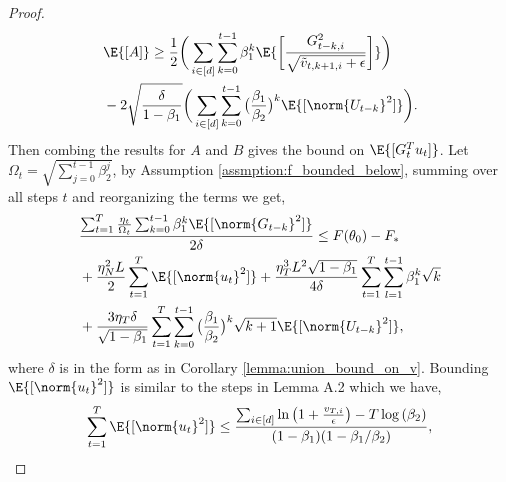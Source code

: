 \documentclass[letterpaper]{article} %
\begin{document}
\begin{proof}
    \begin{align*}
        &\E{[A]} \geq \frac{1}{2} \bigg( \sum_{i\in[d]} \sum_{k=0}^{t-1} \beta_1^k \E{\bigg[ \frac{G_{t-k,i}^2}{\sqrt{\Tilde{v}_{t, k+1,i}+\epsilon}} \bigg]}  \bigg)\\ &- 2\sqrt{\frac{\delta}{1-\beta_1}} \bigg( \sum_{i\in[d]} \sum_{k=0}^{t-1} \big(\frac{\beta_1}{\beta_2}\big)^k\E{[\norm{U_{t-k}}^2]} \bigg).
    \end{align*}
    Then combing the results for $A$ and $B$ gives the bound on $\E{[G_t^T u_t]}$. Let $\Omega_t=\sqrt{\sum_{j=0}^{t-1}\beta_2^{j}}$, by Assumption \ref{assmption:f_bounded_below}, summing over all steps $t$ and reorganizing the terms we get,
    \begin{align*}
        &\frac{\sum_{t=1}^{T}\frac{\eta_t}{\Omega_t} \sum_{k=0}^{t-1}\beta_1^k \E{[\norm{G_{t-k}}^2]}}{2\delta} \leq F(\theta_0) - F_{*} \\ &+ \frac{\eta_N^2L}{2}\sum_{t=1}^{T} \E{[\norm{u_t}^2]} + \frac{\eta_{T}^3L^2 \sqrt{1-\beta_1}}{4\delta}\sum_{t=1}^{T} \sum_{l=1}^{t-1} \beta_1^k\sqrt{k} \\& + \frac{3\eta_{T}\delta}{\sqrt{1-\beta_1}}\sum_{t=1}^{T}\sum_{k=0}^{t-1}\big(\frac{\beta_1}{\beta_2}\big)^k \sqrt{k+1} \E{[\norm{U_{t-k}}^2]},
    \end{align*}
    where $\delta$ is in the form as in Corollary \ref{lemma:union_bound_on_v}.
    Bounding $\E{[\norm{u_t}^2]}$ is similar to the steps in Lemma A.2 \citep{défossez2022simple} which we have,
    \begin{gather*}
        \sum_{t=1}^{T} \E{[\norm{u_t}^2]} \leq \frac{\sum_{i \in [d]} \ln{\big( 1+\frac{v_{T,i}}{\epsilon} \big) - T \log{(\beta_2)}}}{(1-\beta_1)(1-\beta_1/\beta_2)} ,\\

\end{gather*}
\end{proof}
\end{document}
